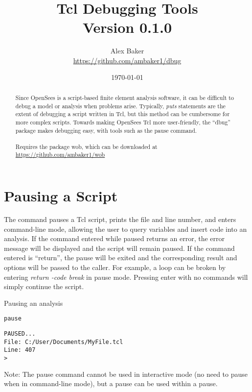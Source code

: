 \documentclass{article}
\title{\Huge Tcl Debugging Tools\\\small Version 0.1.0}
\author{Alex Baker\\\small\hyperlink{https://github.com/ambaker1/dbug}{https://github.com/ambaker1/dbug}}
\date{\small\today}
\renewcommand{\^}[1]{\textsuperscript{#1}}
\renewcommand{\_}[1]{\textsubscript{#1}}
\begin{document}
\maketitle
\begin{abstract}
Since OpenSees is a script-based finite element analysis software, it can be difficult to debug a model or analysis when problems arise.
Typically, \textit{puts} statements are the extent of debugging a script written in Tcl, but this method can be cumbersome for more complex scripts.
Towards making OpenSees Tcl more user-friendly, the ``dbug'' package makes debugging easy, with tools such as the pause command.
\\\\
Requires the package wob, which can be downloaded at \hyperlink{https://github.com/ambaker1/wob}{https://github.com/ambaker1/wob}
\end{abstract}
\clearpage
\section{Pausing a Script} 
The  command pauses a Tcl script, prints the file and line number, and enters command-line mode, allowing the user to query variables and insert code into an analysis. If the command entered while paused returns an error, the error message will be displayed and the script will remain paused. If the command entered is ``return'', the pause will be exited and the corresponding result and options will be passed to the caller. For example, a loop can be broken by entering \textit{return -code break} in pause mode. Pressing enter with no commands will simply continue the script.
\begin{syntax}
\end{syntax}
\begin{example}{Pausing an analysis}
\begin{lstlisting}
pause
\end{lstlisting}
\tcblower
\begin{lstlisting}
PAUSED...
File: C:/User/Documents/MyFile.tcl
Line: 407
> 
\end{lstlisting}
\end{example}
Note: The pause command cannot be used in interactive mode (no need to pause when in command-line mode), but a pause can be used within a pause.
\clearpage
\end{document}
